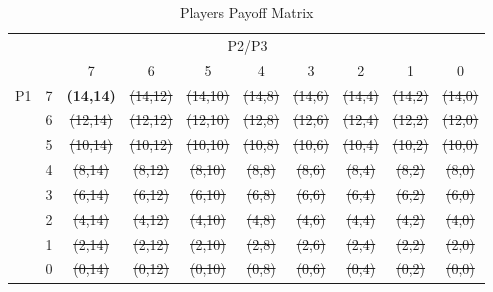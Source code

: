 \begin{table}[h]
  \centering
  \caption{Players Payoff Matrix}\label{tab:5}
  \begin{tabular}{l|c|c|c|c|c|c|c|c|c}
    \toprule
    \multicolumn{2}{c}{} &\multicolumn{7}{c}{P2/P3} \\ \cline{3-10}
    \multicolumn{2}{c}{}    & 7 & 6 & 5 & 4 & 3 & 2 & 1 & 0 \\ \hline \hline
    \multirow{8}{*}{P1} & 7 & \textbf{(14,14)} & \sout{(14,12)} & \sout{(14,10)} & \sout{(14,8)} & \sout{(14,6)} & \sout{(14,4)} & \sout{(14,2)} & \sout{(14,0)} \\ \cline{2-10}
                        & 6 & \sout{(12,14)} & \sout{(12,12)} & \sout{(12,10)} & \sout{(12,8)} & \sout{(12,6)} & \sout{(12,4)} & \sout{(12,2)} & \sout{(12,0)} \\ \cline{2-10}
                        & 5 & \sout{(10,14)} & \sout{(10,12)} & \sout{(10,10)} & \sout{(10,8)} & \sout{(10,6)} & \sout{(10,4)} & \sout{(10,2)} & \sout{(10,0)} \\ \cline{2-10}
                        & 4 & \sout{(8,14)} & \sout{(8,12)} & \sout{(8,10)} & \sout{(8,8)} & \sout{(8,6)} & \sout{(8,4)} & \sout{(8,2)} & \sout{(8,0)} \\ \cline{2-10}
                        & 3 & \sout{(6,14)} & \sout{(6,12)} & \sout{(6,10)} & \sout{(6,8)} & \sout{(6,6)} & \sout{(6,4)} & \sout{(6,2)} & \sout{(6,0)} \\ \cline{2-10}
                        & 2 & \sout{(4,14)} & \sout{(4,12)} & \sout{(4,10)} & \sout{(4,8)} & \sout{(4,6)} & \sout{(4,4)} & \sout{(4,2)} & \sout{(4,0)} \\ \cline{2-10}
                        & 1 & \sout{(2,14)} & \sout{(2,12)} & \sout{(2,10)} & \sout{(2,8)} & \sout{(2,6)} & \sout{(2,4)} & \sout{(2,2)} & \sout{(2,0)} \\ \cline{2-10}
                        & 0 & \sout{(0,14)} & \sout{(0,12)} & \sout{(0,10)} & \sout{(0,8)} & \sout{(0,6)} & \sout{(0,4)} & \sout{(0,2)} & \sout{(0,0)} \\ \cline{2-10}
    \bottomrule
  \end{tabular}
\end{table}

